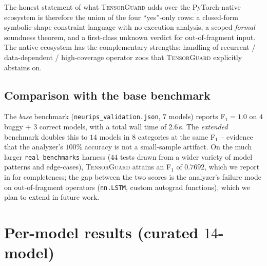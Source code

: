 \documentclass{article}
\theoremstyle{definition}
\begin{document}
The honest statement of what \textsc{TensorGuard} adds over the
PyTorch-native ecosystem is therefore the union of the four
``yes''-only rows: a closed-form symbolic-shape constraint
language with no-execution analysis, a scoped \emph{formal}
soundness theorem, and a first-class \textsf{unknown} verdict for
out-of-fragment input. The native ecosystem has the complementary
strengths: handling of recurrent / data-dependent / high-coverage
operator zoos that \textsc{TensorGuard} explicitly
\textsf{abstain}s on.

\subsection{Comparison with the base benchmark}\label{sec:base-vs-ext}

The \emph{base} benchmark (\texttt{neurips\_validation.json}, $7$
models) reports F$_1=1.0$ on $4$ buggy + $3$ correct models, with a
total wall time of $2.6$\,s. The \emph{extended} benchmark doubles
this to $14$ models in $8$ categories at the same F$_1$ -- evidence
that the analyzer's $100\%$ accuracy is not a small-sample artifact.
On the much larger \verb|real_benchmarks| harness ($44$ tests drawn
from a wider variety of model patterns and edge-cases),
\textsc{TensorGuard} attains an F$_1$ of $0.7692$, which we report
in  for completeness; the gap between the
two scores is the analyzer's failure mode on
out-of-fragment operators (\verb|nn.LSTM|, custom autograd functions),
which we plan to extend in future work.


\section{Per-model results (curated $14$-model)}\label{app:per-model}
\end{document}
